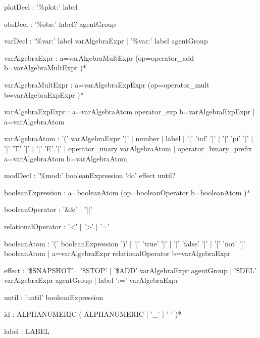 \begin{bnfsource}




plotDecl :
  '\%plot:' label

obsDecl :
  '\%obs:' label? agentGroup

varDecl :
  '\%var:' label varAlgebraExpr
   | '\%var:' label agentGroup

varAlgebraExpr :
  a=varAlgebraMultExpr (op=operator_add b=varAlgebraMultExpr )*
  
varAlgebraMultExpr :
  a=varAlgebraExpExpr (op=operator_mult b=varAlgebraExpExpr )*
  
varAlgebraExpExpr :
  a=varAlgebraAtom operator_exp b=varAlgebraExpExpr
  | a=varAlgebraAtom
  
varAlgebraAtom :
  '(' varAlgebraExpr ')'
  | number
  | label
  | '[' 'inf' ']'
  | '[' 'pi' ']'
  | '[' 'T' ']'
  | '[' 'E' ']'
  | operator_unary varAlgebraAtom
  | operator_binary_prefix a=varAlgebraAtom b=varAlgebraAtom
  
modDecl :
  '\%mod:' booleanExpression 'do' effect until?
  
booleanExpression :
  a=booleanAtom (op=booleanOperator b=booleanAtom )*
  
booleanOperator :
  '&&' | '||'

relationalOperator :
  '<' | '>' | '='

booleanAtom :
  '(' booleanExpression ')'
  | '[' 'true' ']'
  | '[' 'false' ']'
  | '[' 'not' ']' booleanAtom
  | a=varAlgebraExpr relationalOperator b=varAlgebraExpr

effect :
  '\$SNAPSHOT'
  | '\$STOP'
  | '\$ADD' varAlgebraExpr agentGroup
  | '\$DEL' varAlgebraExpr agentGroup
  | label ':=' varAlgebraExpr
  
until :
  'until' booleanExpression
  
  
  
id :
  ALPHANUMERIC ( ALPHANUMERIC | '_' | '-' )* 

label :
  LABEL


\end{bnfsource}
